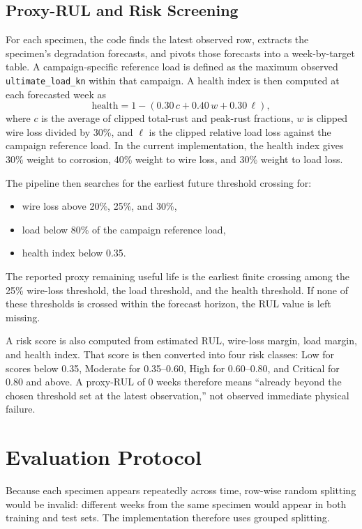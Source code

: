 \documentclass[conference]{IEEEtran}
\begin{document}
\subsection{Proxy-RUL and Risk Screening}
For each specimen, the code finds the latest observed row, extracts the specimen's degradation forecasts, and pivots those forecasts into a week-by-target table. A campaign-specific reference load is defined as the maximum observed \texttt{ultimate\_load\_kn} within that campaign. A health index is then computed at each forecasted week as
\[
\text{health} = 1 - (0.30\,c + 0.40\,w + 0.30\,\ell),
\]
where $c$ is the average of clipped total-rust and peak-rust fractions, $w$ is clipped wire loss divided by 30\%, and $\ell$ is the clipped relative load loss against the campaign reference load. In the current implementation, the health index gives 30\% weight to corrosion, 40\% weight to wire loss, and 30\% weight to load loss.

The pipeline then searches for the earliest future threshold crossing for:
\begin{itemize}
    \item wire loss above 20\%, 25\%, and 30\%,
    \item load below 80\% of the campaign reference load,
    \item health index below 0.35.
\end{itemize}

The reported proxy remaining useful life is the earliest finite crossing among the 25\% wire-loss threshold, the load threshold, and the health threshold. If none of these thresholds is crossed within the forecast horizon, the RUL value is left missing.

A risk score is also computed from estimated RUL, wire-loss margin, load margin, and health index. That score is then converted into four risk classes: Low for scores below 0.35, Moderate for 0.35--0.60, High for 0.60--0.80, and Critical for 0.80 and above. A proxy-RUL of 0 weeks therefore means ``already beyond the chosen threshold set at the latest observation,'' not observed immediate physical failure.

\section{Evaluation Protocol}
Because each specimen appears repeatedly across time, row-wise random splitting would be invalid: different weeks from the same specimen would appear in both training and test sets. The implementation therefore uses grouped splitting.
\end{document}
